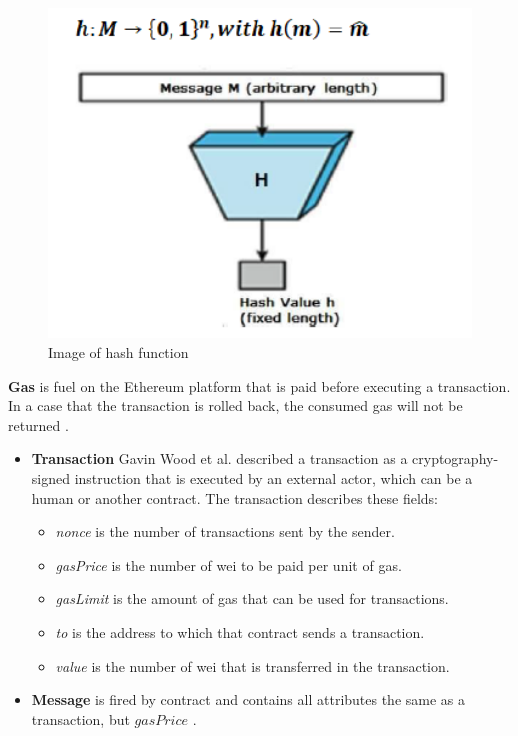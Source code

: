 \begin{center}
	\begin{figure}[htb!]
		
		\begin{minipage}{0.2\linewidth}
			\centering
			\includegraphics[width=4.5\textwidth]{images/chap01_hash_function.png}
		\end{minipage}
		\caption[Image of hash function]{Image of hash function \cite{Dworkin}}
		
	\end{figure}
	
\end{center}
\textbf{Gas} is fuel on the Ethereum platform that is paid before executing a transaction. In a case that the transaction is rolled back, the consumed gas will not be returned \cite{Egbertsen}.\\
\begin{itemize}
    \item \textbf{Transaction}
     Gavin Wood et al. \cite{Gavin} described a transaction as a cryptography-signed instruction that is executed by an external actor, which can be a human or another contract. The transaction describes these fields:
     \begin{itemize}
         \item \textit{nonce} is the number of transactions sent by the sender.
         \item \textit{gasPrice} is the number of wei to be paid per unit of gas.
         \item \textit{gasLimit} is the amount of gas that can be used for transactions.
         \item \textit{to} is the address to which that contract sends a transaction.
         \item \textit{value} is the number of wei that is transferred in the transaction.
     \end{itemize}
        \item \textbf{Message} is fired by contract and contains all attributes the same as a transaction, but $gasPrice$ \cite{Egbertsen}.
\end{itemize}
